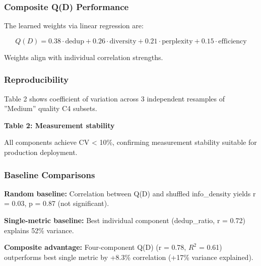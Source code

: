 \subsubsection{Composite Q(D) Performance}

The learned weights via linear regression are:

$$
Q(D) = 0.38 \cdot \text{dedup} + 0.26 \cdot \text{diversity} + 0.21 \cdot \text{perplexity} + 0.15 \cdot \text{efficiency}
$$

Weights align with individual correlation strengths.

\subsubsection{Reproducibility}

Table 2 shows coefficient of variation across 3 independent resamples of ''Medium'' quality C4 subsets.

\textbf{Table 2: Measurement stability}

\begin{table}[htbp]
\centering
{}
\end{table}

All components achieve CV < 10\%, confirming measurement stability suitable for production deployment.

\subsubsection{Baseline Comparisons}

\textbf{Random baseline:} Correlation between Q(D) and shuffled info\_density yields r = 0.03, p = 0.87 (not significant).

\textbf{Single-metric baseline:} Best individual component (dedup\_ratio, r = 0.72) explains 52\% variance.

\textbf{Composite advantage:} Four-component Q(D) (r = 0.78, $R^2$ = 0.61) outperforms best single metric by +8.3\% correlation (+17\% variance explained).
